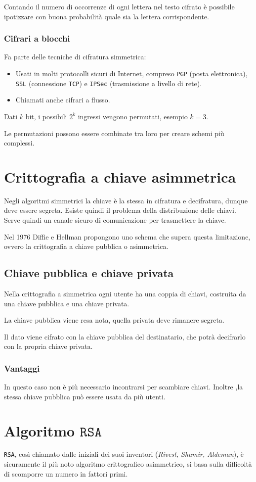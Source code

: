 \documentclass[oneside,a4paper,11pt]{book}
\theoremstyle{italicstyle}
\theoremstyle{normStyle}
\begin{document}
Contando il numero di occorrenze di ogni lettera nel testo cifrato è possibile ipotizzare
con buona probabilità quale sia la lettera corrispondente.
\subsubsection{Cifrari a blocchi}
Fa parte delle tecniche di cifratura simmetrica:
\begin{itemize}
  \item Usati in molti protocolli sicuri di Internet, compreso \verb|PGP| (posta elettronica),
  \verb|SSL| (connessione \verb|TCP|) e \verb|IPSec| (trasmissione a livello di rete).
  \item Chiamati anche cifrari a flusso.
\end{itemize}
Dati $k$ bit, i possibili $2^k$ ingressi vengono permutati, esempio $k=3$.

Le permutazioni possono essere combinate tra loro per creare schemi più complessi.
\section{Crittografia a chiave asimmetrica}
Negli algoritmi simmetrici la chiave è la stessa in cifratura e decifratura, dunque
deve essere segreta. Esiste quindi il problema della distribuzione delle chiavi.
Serve quindi un canale sicuro di comunicazione per trasmettere la chiave.

Nel 1976 Diffie e Hellman propongono uno schema che supera questa limitazione,
ovvero la crittografia a chiave pubblica o asimmetrica.
\subsection{Chiave pubblica e chiave privata}
Nella crittografia a simmetrica ogni utente ha una coppia di chiavi, costruita 
da una chiave pubblica e una chiave privata.

La chiave pubblica viene resa nota, quella privata deve rimanere segreta.

Il dato viene cifrato con la chiave pubblica del destinatario, che potrà decifrarlo 
con la propria chiave privata.
\subsubsection{Vantaggi}
In questo caso non è più necessario incontrarsi per scambiare chiavi. Inoltre
,la stessa chiave pubblica può essere usata da più utenti.
\section{Algoritmo $\texttt{RSA}$}
\verb|RSA|, così chiamato dalle iniziali dei suoi inventori (\textit{Rivest,
Shamir, Aldeman}), è sicuramente il più noto algoritmo crittografico asimmetrico,
si basa sulla difficoltà di scomporre un numero in fattori primi.
\end{document}
